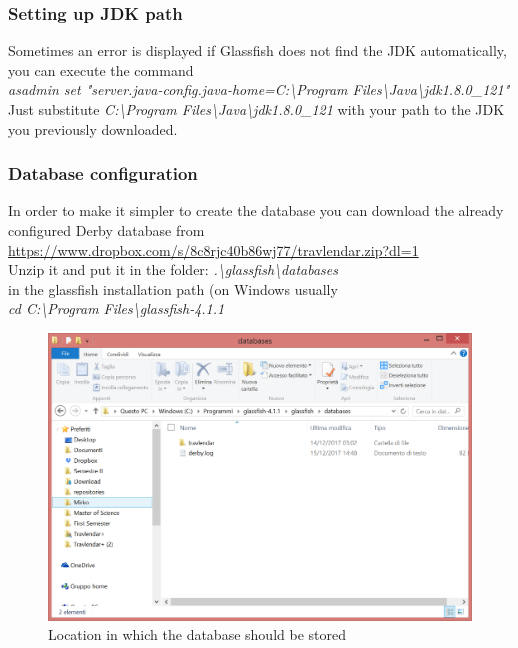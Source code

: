 \subsubsection{Setting up JDK path}
Sometimes an error is displayed if Glassfish does not find the JDK automatically, you can execute the command \\ \textit{asadmin set "server.java-config.java-home=C:\textbackslash Program Files\textbackslash Java\textbackslash jdk1.8.0_121"} \\
Just substitute \textit{C:\textbackslash Program Files\textbackslash Java\textbackslash jdk1.8.0_121} with your path to the JDK you previously downloaded.

\subsubsection{Database configuration}
In order to make it simpler to create the database you can download the already configured Derby database from \\
\href{url}{https://www.dropbox.com/s/8c8rjc40b86wj77/travlendar.zip?dl=1}
\\Unzip it and put it in the folder: \textit{.\textbackslash glassfish\textbackslash databases}\\ in the glassfish installation path (on Windows usually \\
\textit{cd C:\textbackslash Program Files\textbackslash glassfish-4.1.1}
\begin{figure}[H]
\begin{center}
		\includegraphics[width=1.1\textwidth]{images/databaselocation}
		\caption{Location in which the database should be stored}
		\label{asadminstart}
\end{center}
\end{figure}


